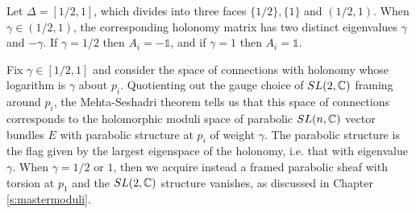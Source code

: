 	Let $\Delta = [1/2,1]$, which divides into three faces $\{1/2\}, \{1\}$ and $(1/2,1)$. When $\gamma \in (1/2,1)$, the corresponding holonomy matrix has two distinct eigenvalues $\gamma$ and $-\gamma$.  If $\gamma=1/2$ then $A_i = -\mathds{1}$, and if $\gamma = 1$ then $A_i = \mathds{1}$.
	
	Fix $\gamma \in [1/2,1]$ and consider the space of connections with holonomy whose logarithm is $\gamma$ about $p_i$. Quotienting out the gauge choice of $SL(2,\mathbb{C})$ framing around $p_i$, the Mehta-Seshadri theorem \cite{mehta_moduli_1980} tells us that this space of connections corresponds to the holomorphic moduli space of parabolic $SL(n,\mathbb{C})$ vector bundles $E$ with parabolic structure at $p_i$ of weight $\gamma$. The parabolic structure is the flag given by the largest eigenspace of the holonomy, i.e. that with eigenvalue $\gamma$. When $\gamma = 1/2$ or $1$, then we acquire instead a framed parabolic sheaf with torsion at $p_1$ and the $SL(2,\mathbb{C})$ structure vanishes, as discussed in Chapter \ref{s:mastermoduli}.
		
